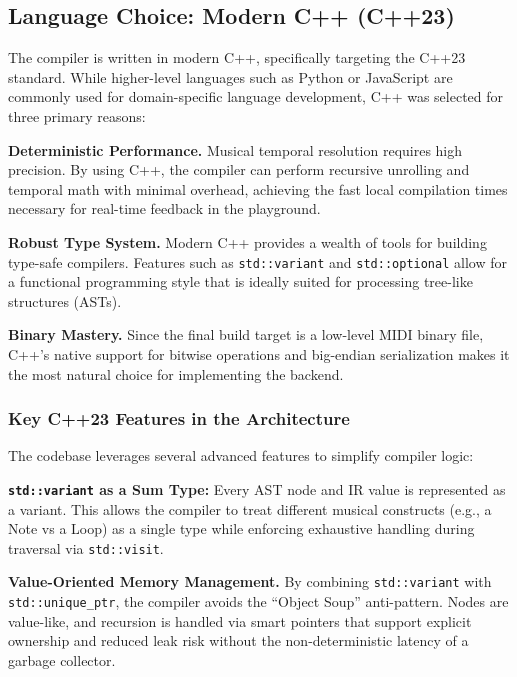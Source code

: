 \subsection{Language Choice: Modern C++ (C++23)}\label{detail-subsec:language-choice:-modern-c++-(c++23)}

The compiler is written in modern C++, specifically targeting the C++23 standard.
While higher-level languages such as Python or JavaScript are commonly used for domain-specific language
development, C++ was selected for
three primary reasons:

\noindent \textbf{Deterministic Performance.} Musical temporal resolution requires high precision.
By using C++, the compiler can perform recursive unrolling and temporal math with minimal overhead, achieving the
fast local compilation times necessary for real-time feedback in the playground.

\noindent \textbf{Robust Type System.} Modern C++ provides a wealth of tools for building type-safe compilers.
Features such as \texttt{std::variant} and \texttt{std::optional} allow for a functional programming style that is
ideally suited for processing tree-like structures (ASTs).

\noindent \textbf{Binary Mastery.} Since the final build target is a low-level MIDI binary file, C++'s native
support for
bitwise operations and big-endian serialization makes it the most natural choice for implementing the backend.

\subsubsection{Key C++23 Features in the Architecture}

The codebase leverages several advanced features to simplify compiler logic:

\noindent \textbf{\texttt{std::variant} as a Sum Type:} Every AST node and IR value is represented as a variant.
This allows the compiler to treat different musical constructs (e.g., a Note vs a Loop) as a single type while
enforcing exhaustive handling during traversal via \texttt{std::visit}.

\noindent \textbf{Value-Oriented Memory Management.} By combining \texttt{std::variant} with
\texttt{std::unique\_ptr}, the
compiler avoids the ``Object Soup'' anti-pattern.
Nodes are value-like, and recursion is handled via smart pointers that support explicit ownership and reduced
leak risk without the
non-deterministic latency of a garbage collector.

